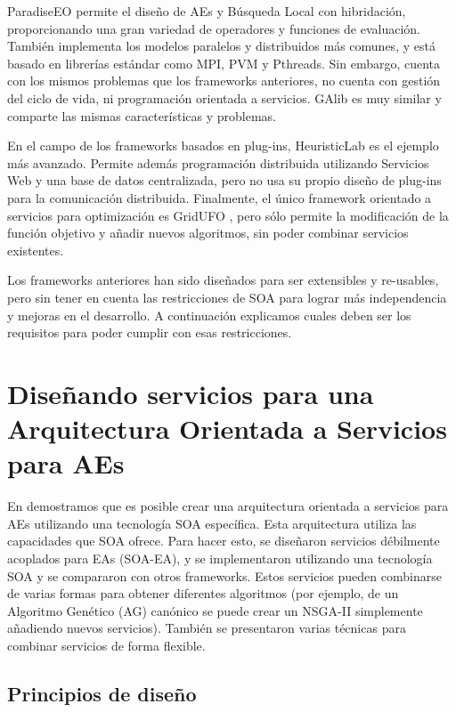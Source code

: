 \documentclass[runningheads]{llncs}
\begin{document}
ParadiseEO \cite{PARADISEO} permite el diseño de AEs y Búsqueda Local con hibridación, proporcionando una gran variedad de operadores y funciones de evaluación. También implementa los modelos paralelos y distribuidos más comunes, y está basado en librerías estándar como MPI, PVM y Pthreads. Sin embargo, cuenta con los mismos problemas que los frameworks anteriores, no cuenta con gestión del ciclo de vida, ni programación orientada a servicios. GAlib \cite{GALIB} es muy similar y comparte las mismas características y problemas. 

En el campo de los frameworks basados en plug-ins, HeuristicLab \cite{HEURISTICLAB} es el ejemplo más avanzado. Permite además programación distribuida utilizando Servicios Web y una base de datos centralizada, pero no usa su propio diseño de plug-ins para la comunicación distribuida. Finalmente, el único framework orientado a servicios para optimización es GridUFO \cite{GRIDUFO}, pero sólo permite la modificación de la función objetivo y añadir nuevos algoritmos, sin poder combinar servicios existentes.

Los frameworks anteriores han sido diseñados para ser extensibles y
re-usables, pero sin tener en cuenta las restricciones de SOA para
lograr más independencia y mejoras en el desarrollo. A continuación explicamos cuales deben ser los requisitos para poder cumplir con esas restricciones.%
\section{Diseñando servicios para una Arquitectura Orientada a Servicios para AEs}
\label{sec:design}

En \cite{OSGILIATH} demostramos que es posible crear una arquitectura orientada a servicios para AEs utilizando una tecnología SOA específica. Esta arquitectura utiliza las capacidades que SOA ofrece. Para hacer esto, se diseñaron servicios débilmente acoplados para EAs (SOA-EA), y se implementaron utilizando una tecnología SOA y se compararon con otros frameworks. Estos servicios pueden combinarse de varias formas para obtener diferentes algoritmos (por ejemplo, de un Algoritmo Genético (AG) canónico se puede crear un NSGA-II simplemente añadiendo nuevos servicios). También se presentaron varias técnicas para combinar servicios de forma flexible.


\subsection{Principios de diseño}
\end{document}
